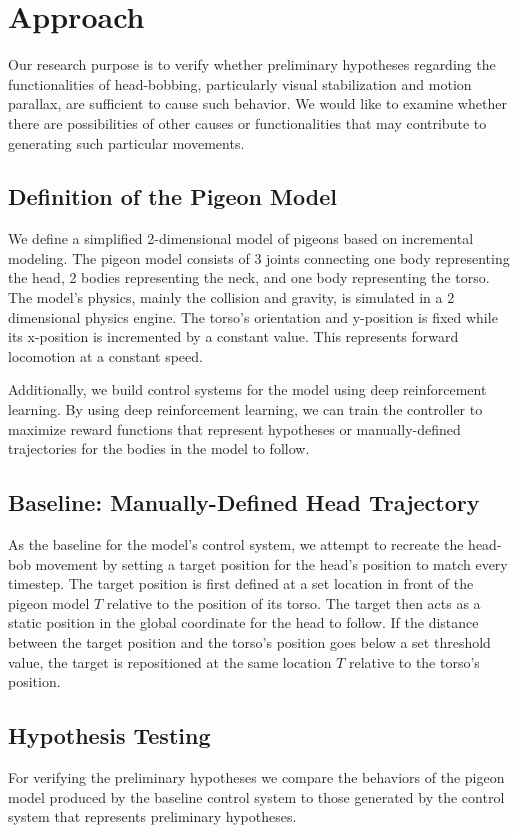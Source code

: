 \chapter{Approach}
Our research purpose is to verify whether preliminary hypotheses regarding the functionalities of head-bobbing, particularly visual stabilization and motion parallax, are sufficient to cause such behavior. We would like to examine whether there are possibilities of other causes or functionalities that may contribute to generating such particular movements.

\section{Definition of the Pigeon Model}
  We define a simplified 2-dimensional model of pigeons based on incremental modeling. The pigeon model consists of 3 joints connecting one body representing the head, 2 bodies representing the neck, and one body representing the torso. The model's physics, mainly the collision and gravity, is simulated in a 2 dimensional physics engine. The torso's orientation and y-position is fixed while its x-position is incremented by a constant value. This represents forward locomotion at a constant speed.

  Additionally, we build control systems for the model using deep reinforcement learning. By using deep reinforcement learning, we can train the controller to maximize reward functions that represent hypotheses or manually-defined trajectories for the bodies in the model to follow.

\section{Baseline: Manually-Defined Head Trajectory}
  As the baseline for the model's control system, we attempt to recreate the head-bob movement by setting a target position for the head's position to match every timestep. The target position is first defined at a set location in front of the pigeon model $T$ relative to the position of its torso. The target then acts as a static position in the global coordinate for the head to follow. If the distance between the target position and the torso's position goes below a set threshold value, the target is repositioned at the same location $T$ relative to the torso's position.

\section{Hypothesis Testing}
  For verifying the preliminary hypotheses we compare the behaviors of the pigeon model produced by the baseline control system to those generated by the control system that represents preliminary hypotheses.

